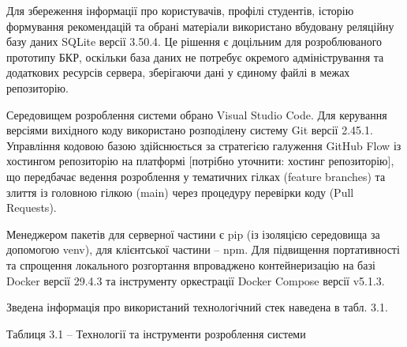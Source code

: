 \documentclass[
]{article}
\begin{document}
Для збереження інформації про користувачів, профілі студентів, історію
формування рекомендацій та обрані матеріали використано вбудовану
реляційну базу даних SQLite версії 3.50.4. Це рішення є доцільним для
розроблюваного прототипу БКР, оскільки база даних не потребує окремого
адміністрування та додаткових ресурсів сервера, зберігаючи дані у
єдиному файлі в межах репозиторію.

Середовищем розроблення системи обрано Visual Studio Code. Для керування
версіями вихідного коду використано розподілену систему Git версії
2.45.1. Управління кодовою базою здійснюється за стратегією галуження
GitHub Flow із хостингом репозиторію на платформі {[}потрібно уточнити:
хостинг репозиторію{]}, що передбачає ведення розроблення у тематичних
гілках (feature branches) та злиття із головною гілкою (main) через
процедуру перевірки коду (Pull Requests).

Менеджером пакетів для серверної частини є pip (із ізоляцією середовища
за допомогою venv), для клієнтської частини -- npm. Для підвищення
портативності та спрощення локального розгортання впроваджено
контейнеризацію на базі Docker версії 29.4.3 та інструменту оркестрації
Docker Compose версії v5.1.3.

Зведена інформація про використаний технологічний стек наведена в табл.
3.1.

Таблиця 3.1 -- Технології та інструменти розроблення системи
\end{document}
